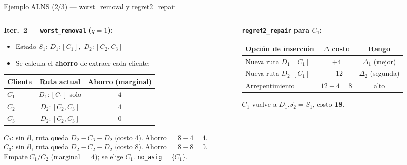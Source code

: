 \documentclass[aspectratio=169,10pt]{beamer}
\begin{document}
\begin{frame}{Ejemplo ALNS (2/3) --- worst\_removal y regret2\_repair}
  \begin{columns}[T,onlytextwidth]
    \begin{column}{0.50\textwidth}
      \textbf{Iter.\ 2 — \texttt{worst\_removal} ($q{=}1$):}
      \vspace{0.2em}
      \begin{itemize}\small
        \item Estado $S_1$: $D_1{:}[C_1]$,\ $D_2{:}[C_2,C_3]$
        \item Se calcula el \textbf{ahorro} de extraer cada cliente:
      \end{itemize}
      \vspace{0.3em}
      \begin{center}\footnotesize
      \begin{tabular}{lcc}
        \toprule
        Cliente & Ruta actual & Ahorro (marginal) \\
        \midrule
        $C_1$ & $D_1{:}[C_1]$ solo & $4$ \\
        $C_2$ & $D_2{:}[C_2,C_3]$ & $4$ \\
        $C_3$ & $D_2{:}[C_2,C_3]$ & $0$ \\
        \bottomrule
      \end{tabular}
      \end{center}
      \vspace{0.2em}
      \footnotesize
      $C_2$: sin él, ruta queda $D_2{-}C_3{-}D_2$ (costo $4$). Ahorro $= 8{-}4{=}4$.\\[0.15em]
      $C_3$: sin él, ruta queda $D_2{-}C_2{-}D_2$ (costo $8$). Ahorro $= 8{-}8{=}0$.\\[0.3em]
      \small Empate $C_1{/}C_2$ (marginal $=4$); se elige $C_1$.
      \quad \texttt{no\_asig}$=\{C_1\}$.
    \end{column}
    \begin{column}{0.48\textwidth}
      \textbf{\texttt{regret2\_repair} para $C_1$:}
      \vspace{0.3em}
      \begin{center}\footnotesize
      \begin{tabular}{lcc}
        \toprule
        Opción de inserción & $\Delta$ costo & Rango \\
        \midrule
        Nueva ruta $D_1{:}[C_1]$ & $+4$ & $\Delta_1$ (mejor) \\
        Nueva ruta $D_2{:}[C_1]$ & $+12$ & $\Delta_2$ (segunda) \\
        \midrule
        Arrepentimiento & $12{-}4 = 8$ & alto \\
        \bottomrule
      \end{tabular}
      \end{center}
      \vspace{0.2em}
      \small $C_1$ vuelve a $D_1$.\quad $S_2 = S_1$, costo $\mathbf{18}$.


\end{column}
\end{columns}
\end{frame}
\end{document}
